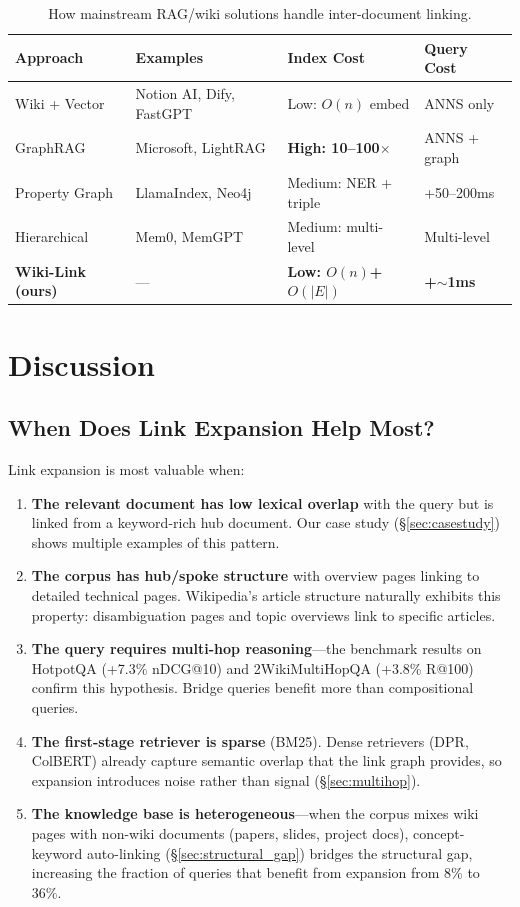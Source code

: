 \documentclass[sigconf,review]{acmart}
\begin{document}
\begin{table}[t]
\caption{How mainstream RAG/wiki solutions handle inter-document linking.}
\label{tab:landscape}
\small
\begin{tabularx}{\columnwidth}{@{}>{\raggedright}p{}>{\raggedright\arraybackslash}X>{\raggedright}p{}>{\raggedright\arraybackslash}X@{}}
\toprule
\textbf{Approach} & \textbf{Examples} & \textbf{Index Cost} & \textbf{Query Cost} \\
\midrule
Wiki + Vector & Notion AI, Dify, FastGPT & Low: $O(n)$ embed & ANNS only \\
GraphRAG & Microsoft, LightRAG & \textbf{High: 10--100$\times$} & ANNS + graph \\
Property Graph & LlamaIndex, Neo4j & Medium: NER + triple & +50--200ms \\
Hierarchical & Mem0, MemGPT & Medium: multi-level & Multi-level \\
\textbf{Wiki-Link (ours)} & --- & \textbf{Low: $O(n)$+$O(|E|)$} & \textbf{+${\sim}$1ms} \\
\bottomrule
\end{tabularx}
\end{table}


\section{Discussion}
\label{sec:discussion}

\subsection{When Does Link Expansion Help Most?}

Link expansion is most valuable when:
\begin{enumerate}
  \item \textbf{The relevant document has low lexical overlap} with the query but is linked from a keyword-rich hub document.  Our case study (\S\ref{sec:casestudy}) shows multiple examples of this pattern.
  \item \textbf{The corpus has hub/spoke structure} with overview pages linking to detailed technical pages.  Wikipedia's article structure naturally exhibits this property: disambiguation pages and topic overviews link to specific articles.
  \item \textbf{The query requires multi-hop reasoning}---the benchmark results on HotpotQA (+7.3\% nDCG@10) and 2WikiMultiHopQA (+3.8\% R@100) confirm this hypothesis.  Bridge queries benefit more than compositional queries.
  \item \textbf{The first-stage retriever is sparse} (BM25).  Dense retrievers (DPR, ColBERT) already capture semantic overlap that the link graph provides, so expansion introduces noise rather than signal (\S\ref{sec:multihop}).
  \item \textbf{The knowledge base is heterogeneous}---when the corpus mixes wiki pages with non-wiki documents (papers, slides, project docs), concept-keyword auto-linking (\S\ref{sec:structural_gap}) bridges the structural gap, increasing the fraction of queries that benefit from expansion from 8\% to 36\%.
\end{enumerate}
\end{document}
